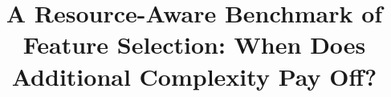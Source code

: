 \documentclass[preprint,12pt,authoryear]{elsarticle}
\begin{document}
\begin{frontmatter}



\title{A Resource-Aware Benchmark of Feature Selection: When Does Additional Complexity Pay Off?}


\author{} %



\end{frontmatter}
\end{document}
